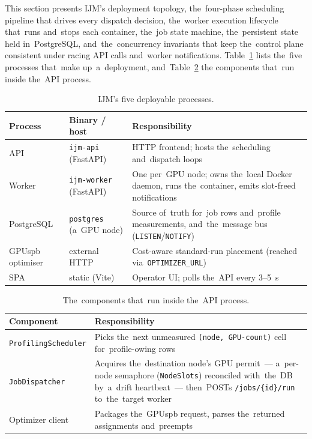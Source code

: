 This section presents IJM's deployment topology, the~four-phase
scheduling pipeline that drives every dispatch decision, the~worker
execution lifecycle that~runs and~stops each container, the~job state
machine, the~persistent state held in~PostgreSQL, and~the~concurrency
invariants that keep the~control plane consistent under racing API
calls and~worker notifications.  Table~\ref{tab:processes} lists the~five
processes that~make up~a~deployment, and~Table~\ref{tab:api-components} the
components that~run inside the~API process.

\begin{table}[H]
\centering\small
\begin{tabularx}{\textwidth}{@{}l l X@{}}
\toprule
\textbf{Process} & \textbf{Binary / host} & \textbf{Responsibility} \\
\midrule
API              & \texttt{ijm-api} (FastAPI)     & HTTP frontend; hosts the~scheduling and~dispatch loops \\
Worker           & \texttt{ijm-worker} (FastAPI)  & One per~GPU node; owns the~local Docker daemon, runs the~container, emits slot-freed notifications \\
PostgreSQL       & \texttt{postgres} (a~GPU node) & Source of~truth for~job rows and~profile measurements, and~the~message bus (\texttt{LISTEN}/\texttt{NOTIFY}) \\
GPUspb optimiser & external HTTP                  & Cost-aware standard-run placement (reached via~\texttt{OPTIMIZER\_URL}) \\
SPA              & static (Vite)                 & Operator UI; polls the~API every 3--5~s \\
\bottomrule
\end{tabularx}
\caption{IJM's five deployable processes.}\label{tab:processes}
\end{table}

\begin{table}[H]
\centering\small
\begin{tabularx}{\textwidth}{@{}l X@{}}
\toprule
\textbf{Component} & \textbf{Responsibility} \\
\midrule
\texttt{ProfilingScheduler} & Picks the~next unmeasured \texttt{(node, GPU-count)} cell for~profile-owing rows \\
\texttt{JobDispatcher}      & Acquires the~destination node's GPU permit~--- a~per-node semaphore (\texttt{NodeSlots}) reconciled with~the~DB by~a~drift heartbeat~--- then~POSTs \texttt{/jobs/\{id\}/run} to~the~target worker \\
Optimizer client            & Packages the~GPUspb request, parses the~returned assignments and~preempts \\
\bottomrule
\end{tabularx}
\caption{The~components that~run inside the~API process.}\label{tab:api-components}
\end{table}

